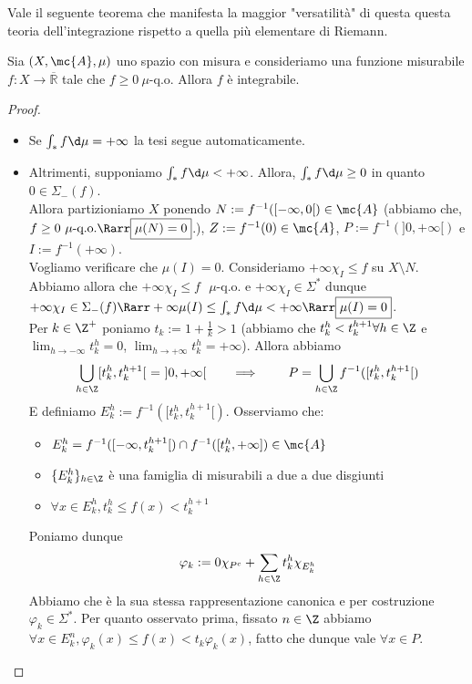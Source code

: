 Vale il seguente teorema che manifesta la maggior "versatilità" di questa questa teoria dell'integrazione rispetto a quella più elementare di Riemann.

\begin{shadedTheorem}[$**$]\label{thm: 2.3}
    Sia $(X, \mc{A}, \mu)$ uno spazio con misura e consideriamo una funzione misurabile $f: X \rightarrow \overline{\mathbb{R}}$ tale che $f \geq 0 \ \mu$-q.o. Allora $f$ è integrabile.
\end{shadedTheorem}
\begin{proof}
    \begin{itemize}
        \item Se $\int_* f \d \mu = +\infty$ la tesi segue automaticamente.
        \item Altrimenti, supponiamo $\int_* f \d \mu < +\infty$. Allora, $\int_* f \d \mu \ge 0$ in quanto $0 \in \Sigma_-(f)$.\\
        Allora partizioniamo $X$ ponendo $N := f^{-1}([-\infty,0[) \in \mc{A}$ (abbiamo che, $f \ge 0 \text{ $\mu$-q.o.} \Rarr \boxed{\mu(N)=0}$.), $Z := f^{-1}(0) \in \mc{A}$, $P := f^{-1}(]0,+\infty[)$ e $I := f^{-1}(+\infty)$.\\
        Vogliamo verificare che $\mu(I)=0$. Consideriamo $+\infty \chi_I \le f$ su $X \setminus N$. Abbiamo allora che $+\infty \chi_I \le f \text{ $\mu$-q.o.}$ e $+\infty \chi_I \in \Sigma^*$ dunque $+\infty \chi_I \in \Sigma_-(f) \Rarr +\infty\mu(I) \le \int_* f \d \mu < +\infty \Rarr \boxed{\mu(I)=0}$.\\
        Per $k \in \Z^+ $ poniamo $t_k := 1 + \frac{1}{k} > 1$ (abbiamo che $t_k^h < t_k^{h+1} \forall h \in \Z$ e $\lim_{h \to -\infty} t_k^h = 0$, $\lim_{h \to +\infty} t_k^h = +\infty$). Allora abbiamo \[\bigcup_{h \in \Z} [t_k^h,t_k^{h+1}[\ =\ ]0,+\infty[\qquad \implies\qquad P = \bigcup_{h \in \Z}f^{-1}([t_k^h,t_k^{h+1}[)\]
        E definiamo $E_k^h := f^{-1}([t_k^h,t_k^{h+1}[)$. Osserviamo che:
        \begin{itemize}
            \item $E_k^h = f^{-1}([-\infty,t_k^{h+1}[) \cap f^{-1}([t_k^h,+\infty]) \in \mc{A}$
            \item $\{E_k^h\}_{h \in \Z}$ è una famiglia di misurabili a due a due disgiunti
            \item $\forall x \in E_k^h, t_k^h \le f(x) < t_k^{h+1}$
        \end{itemize}
        Poniamo dunque \[\varphi_k := 0 \chi_{P^c} + \sum_{h \in \Z} t_k^h \chi_{E_k^h}\]
        Abbiamo che è la sua stessa rappresentazione canonica e per costruzione $\varphi_k \in \Sigma^*$. Per quanto osservato prima, fissato $n \in \Z$ abbiamo $\forall x \in E_k^n, \varphi_k(x) \le f(x) < t_k\varphi_k(x)$, fatto che dunque vale $\forall x \in P$.\\

\end{itemize}
\end{proof}

